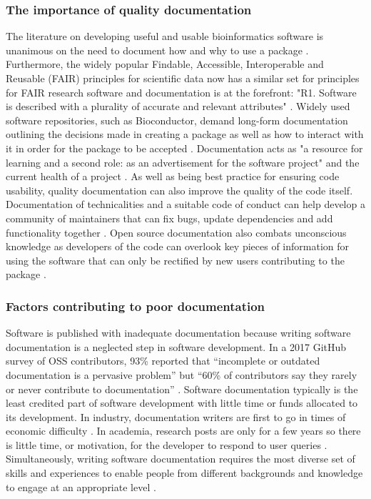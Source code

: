 \documentclass[../main.tex]{subfiles}
\begin{document}
\subsubsection{The importance of quality documentation}

The literature on developing useful and usable bioinformatics software is unanimous on the need to document how and why to use a package \parencite{Wilson2017,Taschuk2017,Leprevost2014}.
Furthermore, the widely popular Findable, Accessible, Interoperable and Reusable (FAIR) principles for scientific data now has a similar set for principles for FAIR research software and documentation is at the forefront: "R1. Software is described with a plurality of accurate and relevant attributes" \parencite{Barker2022}.
Widely used software repositories, such as Bioconductor, demand long-form documentation outlining the decisions made in creating a package as well as how to interact with it in order for the package to be accepted \parencite{Gentleman2004}.
Documentation acts as "a resource for learning and a second role: as an advertisement for the software project" and the current health of a project \parencite{Geiger2018}.
As well as being best practice for ensuring code usability, quality documentation can also improve the quality of the code itself.
Documentation of technicalities and a suitable code of conduct can help develop a community of maintainers that can fix bugs, update dependencies and add functionality together \parencite{Community2022}.
Open source documentation also combats unconscious knowledge as developers of the code can overlook key pieces of information for using the software that can only be rectified by new users contributing to the package \parencite{Hermann2022}.


\subsubsection{Factors contributing to poor documentation}

Software is published with inadequate documentation because writing software documentation is a neglected step in software development.
In a 2017 GitHub survey of OSS contributors, 93\% reported that “incomplete or outdated documentation is a pervasive problem” but “60\% of contributors say they rarely or never contribute to documentation” \parencite{Geiger2017}.
Software documentation typically is the least credited part of software development with little time or funds allocated to its development.
In industry, documentation writers are first to go in times of economic difficulty \parencite{Forward2002}.
In academia, research posts are only for a few years so there is little time, or motivation, for the developer to respond to user queries \parencite{Hermann2022}.
Simultaneously, writing software documentation requires the most diverse set of skills and experiences to enable people from different backgrounds and knowledge to engage at an appropriate level \parencite{Geiger2018}.
\end{document}

